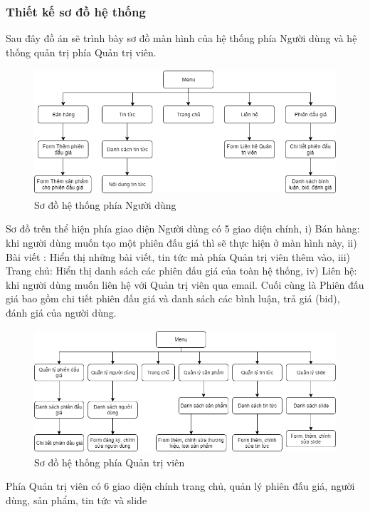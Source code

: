 \documentclass{article}
\begin{document}
\subsubsection{Thiết kế sơ đồ hệ thống}
Sau đây đồ án sẽ trình bày sơ đồ màn hình của hệ thống phía Người dùng và hệ thống quản trị phía Quản trị viên.
\begin{figure}[H]
    \centering
    \includegraphics[width=11.4cm,height=4.65cm]{images/clientpage.png}
    \caption{Sơ đồ hệ thống phía Người dùng}
    \label{hinh46}
\end{figure}
Sơ đồ trên thể hiện phía giao diện Người dùng có 5 giao diện chính, i) Bán hàng: khi người dùng muốn tạo một phiên đấu giá thì sẽ thực hiện ở màn hình này, ii) Bài viết : Hiển thị những bài viết, tin tức mà phía Quản trị viên thêm vào, iii) Trang chủ:  Hiển thị danh sách các phiên đấu giá của toàn hệ thống, iv) Liên hệ: khi người dùng muốn liên hệ với Quản trị viên qua email. Cuối cùng là Phiên đấu giá bao gồm chi tiết phiên đấu giá và danh sách các bình luận, trả giá (bid), đánh giá của người dùng.
\begin{figure}[H]
    \centering
    \includegraphics[width=11.4cm,height=4.54cm]{images/adminpage.png}
    \caption{Sơ đồ hệ thống phía Quản trị viên}
    \label{hinh47}
\end{figure}
Phía Quản trị viên có 6 giao diện chính trang chủ, quản lý phiên đấu giá, người dùng, sản phẩm, tin tức và slide
\end{document}
